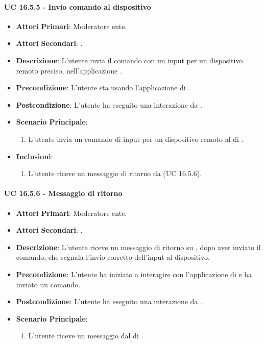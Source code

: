 		\paragraph{UC 16.5.5 - Invio comando al dispositivo}
		\begin{itemize}
			\item \textbf{Attori Primari}: Moderatore ente.
			\item \textbf{Attori Secondari}: .
			\item \textbf{Descrizione}: L'utente invia il comando con un input per un dispositivo remoto preciso, nell'applicazione .
			\item \textbf{Precondizione}: L'utente sta usando l'applicazione di .
			\item \textbf{Postcondizione}: L'utente ha eseguito una interazione da .
			\item \textbf{Scenario Principale}:
			\begin{enumerate}
				\item L'utente invia un comando di input per un dispositivo remoto al  di .
			\end{enumerate}
			\item \textbf{Inclusioni}:
			\begin{enumerate}
				\item L'utente riceve un messaggio di ritorno da  (UC 16.5.6).
			\end{enumerate}
		\end{itemize}

		\paragraph{UC 16.5.6 - Messaggio di ritorno }
		\begin{itemize}
			\item \textbf{Attori Primari}: Moderatore ente.
			\item \textbf{Attori Secondari}: .
			\item \textbf{Descrizione}: L'utente riceve un messaggio di ritorno su , dopo aver inviato il comando, che segnala l'invio corretto dell'input al dispositivo. 
			\item \textbf{Precondizione}: L'utente ha iniziato a interagire con l'applicazione di  e ha inviato un comando.
			\item \textbf{Postcondizione}: L'utente ha eseguito una interazione da .
			\item \textbf{Scenario Principale}:
			\begin{enumerate}
				\item L'utente riceve un messaggio dal  di .
			\end{enumerate}
		\end{itemize}	

		




